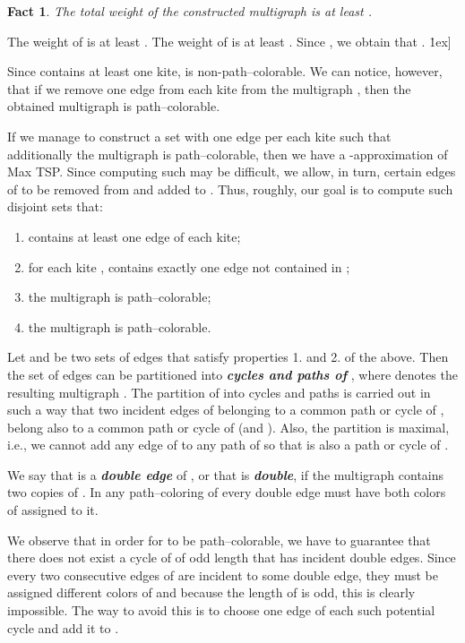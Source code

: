 \documentclass[a4, 11pt]{article}
\newcommand{\dowod}{\noindent{\bf Proof.~}}
\newcommand{\koniec}{\hfill \.1ex]}
\newcommand{\<}{\langle}
\renewcommand{\>}{\rangle}
\newtheorem{fact}{Fact}
\begin{document}
\begin{fact}
The total weight of the constructed multigraph  is at least .
\end{fact} 
\dowod
The weight of  is at least . The weight of  is at least . Since , we obtain
that . \koniec



Since  contains at least one kite,  is non-path--colorable. We can notice, however, that if we remove one edge from each kite from the multigraph , then the obtained multigraph is path--colorable. 



If we manage to construct a set  with one edge per each kite such that additionally the multigraph  is path--colorable, then we have a -approximation of Max TSP. Since computing such  may be difficult, we allow, in turn, certain edges of  to be removed from  and added to . Thus, roughly,  our goal is to compute such disjoint sets  that:

\begin{enumerate}

\item  contains at least  one edge of each kite;
\item for each kite ,  contains exactly one edge not contained in ; 
\item the multigraph  is path--colorable;
\item the multigraph  is path--colorable.
\end{enumerate} 


Let  and  be two sets of edges that satisfy properties 1. and 2. of the above. Then  the set of edges   can be partitioned into {\bf \em cycles and paths of }, where  denotes the resulting multigraph .  The partition of  into cycles and paths is carried out in such a way that two incident edges of  belonging to a common path or cycle of , belong also to a common path or cycle of  (and ). Also, the partition is maximal, i.e., we cannot
add any edge  of  to any path  of  so that  is also a path or cycle of .

We say that  is a {\bf \em double edge} of , or that  is {\bf \em double}, if the multigraph  contains two copies of . In any path--coloring of  every double edge must have both colors of  assigned to it. 

We observe that in order for  to be path--colorable,  we have to guarantee that  there does not exist   a cycle
  of  of odd length  that  has  incident double edges. Since every two consecutive edges of  are incident to some double edge, they must be assigned different colors of  and because the length of  is odd, this is clearly impossible. The way to avoid 
this is to choose one edge of each such potential cycle and add it to . 
\end{document}
